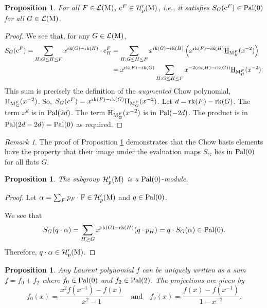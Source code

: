 \documentclass[11pt]{article}
\newcommand{\calH}{\mathcal{H}}
\newcommand{\chow}{\normalfont\text{\underline{H}}}
\newcommand{\augchow}{\normalfont\text{H}}
\newcommand{\rank}{\normalfont\text{rk}}
\newcommand{\M}{\normalfont\text{M}}
\newcommand{\Ebasis}[1]{\mathrm{#1}}
\newcommand{\Cbasis}[1]{\mathrm{c}^{#1}}
\newcommand{\CbasisSub}[2]{\mathrm{c}^{#1}_{#2}}
\newcommand{\pal}{\normalfont\text{Pal}}
\newtheorem{proposition}[theorem]{Proposition}
\theoremstyle{remark}
\newtheorem*{remark}{Remark} %
\begin{document}
\begin{proposition}\label{prop:cinHp}
    For all \(F \in \mathcal{L}(\M)\), \(\Cbasis{F} \in \calH'_p(\M)\), i.e.,
    it satisfies \(S_G(\Cbasis{F}) \in \pal(0)\) for all \(G \in \mathcal{L}(\M)\).
\end{proposition}
\begin{proof}
    We see that, for any \(G \in \mathcal{L}(\M)\),
    \begin{align*}
        S_G(\Cbasis{F}) = \sum_{H: G \le H \le F} x^{\rank(G)-\rank(H)}\cdot\CbasisSub{F}{H}
         & = \sum_{H: G \le H \le F} x^{\rank(G)-\rank(H)} \left( x^{\rank(F)-\rank(H)} \chow_{\M_H^F}(x^{-2}) \right) \\
         & = x^{\rank(F)-\rank(G)} \sum_{H: G \le H \le F} x^{-2(\rank(H) -\rank(G))} \chow_{\M_H^F}(x^{-2}).
    \end{align*}
    This sum is precisely the definition of the \textit{augmented} Chow polynomial, \(\augchow_{\M_G^F}(x^{-2})\). So,
    \(S_G(c^F) = x^{\rank(F)-\rank(G)} \augchow_{\M_G^F}(x^{-2})\). Let \(d = \rank(F)-\rank(G)\).
    The term \(x^d\) is in \(\pal(2d)\).
    The term \(\augchow_{\M_G^F}(x^{-2})\) is in \(\pal(-2d)\).
    The product is in \(\pal(2d - 2d) = \pal(0)\) as required.
\end{proof}
\begin{remark}
    The proof of Proposition \ref{prop:cinHp} demonstrates that the Chow basis elements have the property that their image under the evaluation maps $S_G$ lies in $\pal(0)$ for all flats $G$.
\end{remark}
\begin{proposition}\label{prop:Hp_is_pal0_mod}
    The subgroup \(\calH'_p(\M)\) is a \(\pal(0)\)-module.
\end{proposition}
\begin{proof}
    Let \(\alpha = \sum_F p_F \cdot \Ebasis{F} \in \calH'_p(\M)\) and \(q \in \pal(0)\).

    We see that
    \[ S_G(q \cdot \alpha) = \sum_{H \ge G} x^{\rank(G)-\rank(H)} (q \cdot p_H)
        = q \cdot S_G(\alpha) \in \pal(0). \]
    Therefore, \(q \cdot \alpha \in \calH'_p(\M)\).
\end{proof}

\begin{proposition}\label{prop:LPDecomposition}
    Any Laurent polynomial \(f\) can be uniquely written as a sum \(f = f_0 + f_2\) where
    \(f_0 \in \pal(0)\) and \(f_2 \in \pal(2)\). The projections are given by
    \[ f_0(x) = \frac{x^2 f(x^{-1}) - f(x)}{x^2 - 1} \quad \text{and} \quad f_2(x) = \frac{f(x) - f(x^{-1})}{1 - x^{-2}}. \]
\end{proposition}
\end{document}

